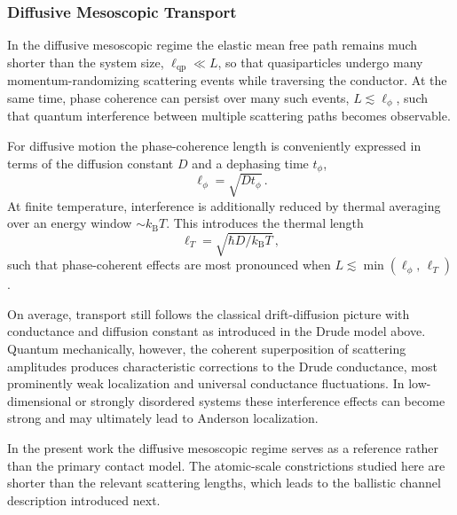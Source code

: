         \subsubsection*{Diffusive Mesoscopic Transport}

            In the diffusive mesoscopic regime the elastic mean free path remains much shorter than the system size, $\ell_\mathrm{qp} \ll L$, so that quasiparticles undergo many momentum-randomizing scattering events while traversing the conductor. At the same time, phase coherence can persist over many such events, $L \lesssim \ell_\phi$, such that quantum interference between multiple scattering paths becomes observable.

            For diffusive motion the phase-coherence length is conveniently expressed in terms of the diffusion constant $D$ and a dephasing time $t_\phi$,
            \begin{equation}
                \ell_\phi = \sqrt{D t_\phi}\,.
                \label{eq:basics:diffusive-coherence-length}
            \end{equation}
            At finite temperature, interference is additionally reduced by thermal averaging over an energy window $\sim k_\mathrm{B}T$. This introduces the thermal length
            \begin{equation}
                \ell_T = \sqrt{\hbar D / k_\mathrm{B}T}\,,
                \label{eq:basics:thermal-length}
            \end{equation}
            such that phase-coherent effects are most pronounced when $L \lesssim \min(\ell_\phi,\,\ell_T)$.

            On average, transport still follows the classical drift-diffusion picture with conductance and diffusion constant as introduced in the Drude model above. Quantum mechanically, however, the coherent superposition of scattering amplitudes produces characteristic corrections to the Drude conductance, most prominently weak localization and universal conductance fluctuations. In low-dimensional or strongly disordered systems these interference effects can become strong and may ultimately lead to Anderson localization.
            \cite{bergmann_weak_1984, lee_universal_1985, lee_disordered_1985, anderson_absence_1958, schertel_magnetic-field_2019}

            In the present work the diffusive mesoscopic regime serves as a reference rather than the primary contact model. The atomic-scale constrictions studied here are shorter than the relevant scattering lengths, which leads to the ballistic channel description introduced next.

